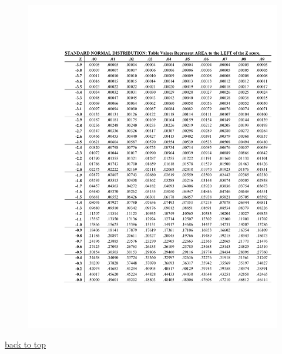 \documentclass[12pt]{article}
\numberwithin{equation}{section}
\begin{document}
\begin{figure}[!ht]
    \centering
    \includegraphics[page=2, width=0.9\linewidth, trim=4.1cm 4cm 1.15cm 4cm]{standardnormaltable.pdf}
\end{figure}

% 

\noindent \begin{flushright} \hyperref[sec:top]{back to top} \end{flushright}
\end{document}
